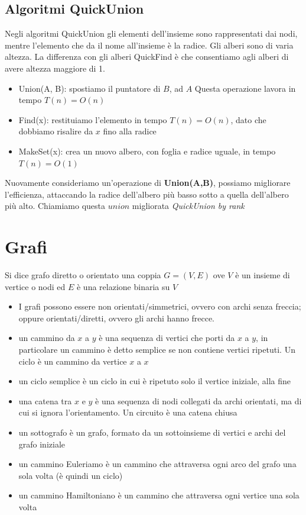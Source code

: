 \documentclass[11pt, oneside]{article}   	%
\begin{document}
\subsection*{Algoritmi QuickUnion}
Negli algoritmi QuickUnion gli elementi dell'insieme sono rappresentati dai nodi, mentre l'elemento che da il nome all'insieme è la radice. Gli alberi sono di varia altezza. La differenza con gli alberi QuickFind è che consentiamo agli alberi di avere altezza maggiore di 1.
\begin{itemize}
\item Union(A, B): spostiamo il puntatore di $B$, ad $A$
Questa operazione lavora in tempo $T(n) = O(n)$
\item Find(x): restituiamo l'elemento in tempo $T(n) = O(n)$, dato che dobbiamo risalire da $x$ fino alla radice
\item MakeSet(x): crea un nuovo albero, con foglia e radice uguale, in tempo $T(n) = O(1)$
\end{itemize}
Nuovamente consideriamo un'operazione di \textbf{Union(A,B)}, possiamo migliorare l'efficienza, attaccando la radice dell'albero più basso sotto a quella dell'albero più alto. Chiamiamo questa $union$ migliorata \emph{QuickUnion by rank}

\section*{Grafi}
 Si dice grafo diretto o orientato una coppia $G = (V,E)$ ove $V$ è un insieme di vertice o nodi ed $E$ è una relazione binaria su $V$
 \begin{itemize}
\item I grafi possono essere non orientati/simmetrici, ovvero con archi senza freccia; oppure orientati/diretti, ovvero gli archi hanno frecce.
\item un cammino da $x$ a $y$ è una sequenza di vertici che porti da $x$ a $y$, in particolare un cammino è detto semplice se non contiene vertici ripetuti. Un ciclo è un cammino da vertice $x$ a $x$ 
\item un ciclo semplice è un ciclo in cui è ripetuto solo il vertice iniziale, alla fine 
\item una catena tra $x$ e $y$ è una sequenza di nodi collegati da archi orientati, ma di cui si ignora l’orientamento. Un circuito è una catena chiusa
\item un sottografo è un grafo, formato da un sottoinsieme di vertici e archi del grafo iniziale
\item un cammino Euleriamo è un cammino che attraversa ogni arco del grafo una sola volta (è quindi un ciclo)
\item un cammino Hamiltoniano è un cammino che attraversa ogni vertice una sola volta
\end{itemize}
\end{document}

